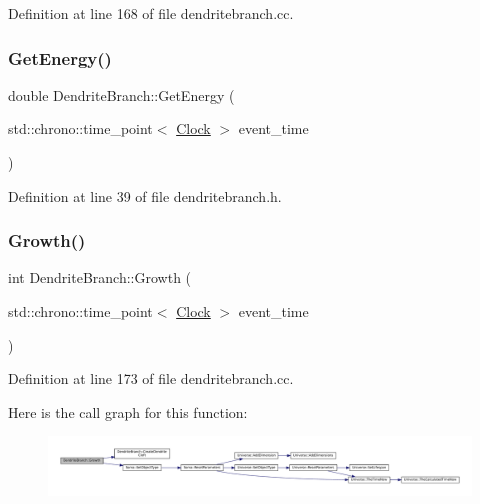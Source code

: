 Definition at line 168 of file dendritebranch.\+cc.

\mbox{\label{class_dendrite_branch_afab2dd907fba115c3483cd9a217ccec0}} 
\subsubsection{\texorpdfstring{Get\+Energy()}{GetEnergy()}}
{\footnotesize\ttfamily double Dendrite\+Branch\+::\+Get\+Energy (\begin{DoxyParamCaption}\item[{std\+::chrono\+::time\+\_\+point$<$ \mbox{\hyperlink{universe_8h_a0ef8d951d1ca5ab3cfaf7ab4c7a6fd80}{Clock}} $>$}]{event\+\_\+time }\end{DoxyParamCaption})\hspace{0.3cm}{\ttfamily [inline]}}



Definition at line 39 of file dendritebranch.\+h.

\mbox{\label{class_dendrite_branch_a4b950ef8a0856a11240d353bcfd1fba4}} 
\subsubsection{\texorpdfstring{Growth()}{Growth()}}
{\footnotesize\ttfamily int Dendrite\+Branch\+::\+Growth (\begin{DoxyParamCaption}\item[{std\+::chrono\+::time\+\_\+point$<$ \mbox{\hyperlink{universe_8h_a0ef8d951d1ca5ab3cfaf7ab4c7a6fd80}{Clock}} $>$}]{event\+\_\+time }\end{DoxyParamCaption})}



Definition at line 173 of file dendritebranch.\+cc.

Here is the call graph for this function\+:\nopagebreak
\begin{figure}[H]
\begin{center}
\leavevmode
\includegraphics[width=350pt]{class_dendrite_branch_a4b950ef8a0856a11240d353bcfd1fba4_cgraph}
\end{center}
\end{figure}
\mbox{\label{class_dendrite_branch_afaca221cb4bba98e56f11b0f9e6370b5}} 
